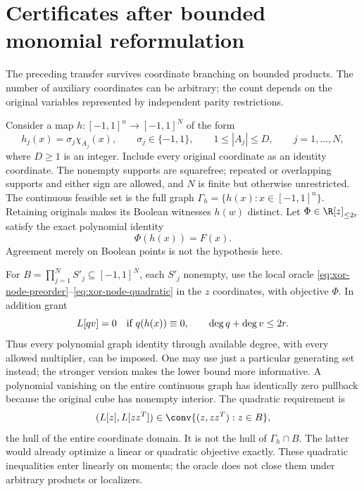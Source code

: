 \section{Certificates after bounded monomial reformulation}
\label{sec:monomial-reformulation}
The preceding transfer survives coordinate branching on bounded products.
The number of auxiliary coordinates can be arbitrary; the count depends
on the original variables represented by independent parity restrictions.

Consider a map $h:[-1,1]^n\to[-1,1]^N$ of the form
\begin{equation}\label{eq:signed-monomial-map}
 h_j(x)=\sigma_j\chi_{A_j}(x),\qquad
 \sigma_j\in\{-1,1\},\qquad 1\le|A_j|\le D,
 \qquad j=1,\ldots,N,
\end{equation}
where $D\ge1$ is an integer. Include every original coordinate as an
identity coordinate. The nonempty supports are squarefree; repeated or
overlapping supports and either sign are allowed, and $N$ is finite but
otherwise unrestricted. The continuous feasible set is the full graph
$\Gamma_h=\{h(x):x\in[-1,1]^n\}$. Retaining originals makes its Boolean
witnesses $h(w)$ distinct. Let $\Phi\in\R[z]_{\le2r}$ satisfy the exact
polynomial identity
\begin{equation}\label{eq:lift-objective-pullback}
 \Phi(h(x))=F(x).
\end{equation}
Agreement merely on Boolean points is not the hypothesis here.

For $B=\prod_{j=1}^N S'_j\subseteq[-1,1]^N$, each $S'_j$ nonempty,
use the local oracle \eqref{eq:xor-node-preorder}--\eqref{eq:xor-node-quadratic}
in the $z$ coordinates, with objective $\Phi$. In addition grant
\begin{equation}\label{eq:lift-all-identities}
 L[qv]=0\quad\hbox{if }q(h(x))\equiv0,
 \qquad\deg q+\deg v\le2r.
\end{equation}
Thus every polynomial graph identity through available degree, with every
allowed multiplier, can be imposed. One may use just a particular generating
set instead; the stronger version makes the lower bound more informative.
A polynomial vanishing on the entire continuous graph has identically
zero pullback because the original cube has nonempty interior.
The quadratic requirement is
\begin{equation}\label{eq:lift-box-hull}
 (L[z],L[zz^T])\in\conv\{(z,zz^T):z\in B\},
\end{equation}
the hull of the entire coordinate domain. It is not the hull of
$\Gamma_h\cap B$. The latter would already optimize a linear or quadratic
objective exactly. These quadratic inequalities enter linearly on moments;
the oracle does not close them under arbitrary products or localizers.

